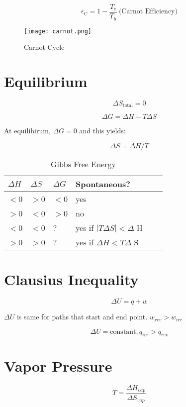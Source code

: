 \documentclass{article}
\begin{document}
\begin{equation*}
\epsilon_{\text{C}} = 1 - \frac{T_\text{c}}{T_\text{h}} \ \text{(Carnot Efficiency)}
\end{equation*}

\begin{figure}[h]
\centering
\texttt{[image: carnot.png]}
\caption{Carnot Cycle}
\end{figure}

\section{Equilibrium}
\begin{equation*}
\Delta S_{\text{total}} = 0
\end{equation*}

\begin{equation*}
\Delta G = \Delta H - T \Delta S
\end{equation*}

At equilibirum, $\Delta G =0$ and this yields:

\[
\Delta S = \Delta H/T 
\]
\begin{table}[h!]
\centering
\caption{Gibbs Free Energy}
\label{my-label}
\def\arraystretch{1.5}
\begin{tabular}{|l|l|l|l|l|l|}
\hline
$\Delta H$ & $\Delta S$ & $\Delta G$ & Spontaneous?  \\
\hline
$<$0 & $>$0 & $<$0 & yes \\
\hline
$>$0 & $<$0 & $>$0 & no\\
\hline
$<$0 & $<$0 & ? & yes if $|T\Delta S| < \Delta$ H  \\
\hline 
$>$0 & $>$0 & ? & yes if $\Delta H < T \Delta$ S \\
\hline
\end{tabular}
\end{table}

\section{Clausius Inequality}
\[
\Delta U = q + w
\]

$\Delta U$ is same for paths that start and end point. $w_{rev} > w_{irr}$

\[
\Delta U = \text{constant}, q_{irr} > q_{rev}
\]

\section{Vapor Pressure}
\[
T = \frac{\Delta H_{vap}}{\Delta S_{vap}}
\]
\end{document}
